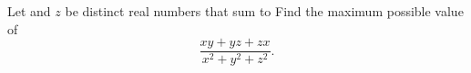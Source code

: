 Let   and $z$ be distinct real numbers that sum to  Find the maximum possible value of \[ \dfrac {xy+yz+zx}{x^2+y^2+z^2}. \]